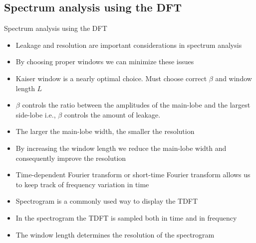 \documentclass[10pt, aspectratio=169]{beamer}
\begin{document}
\subsection{Spectrum analysis using the DFT}
\begin{frame}{Spectrum analysis using the DFT}
\begin{itemize}
	\item Leakage and resolution are important considerations in spectrum analysis
	\item By choosing proper windows we can minimize these issues
	\item Kaiser window is a nearly optimal choice. Must choose correct $\beta$ and window length $L$
	\item $\beta$ controls the ratio between the amplitudes of the main-lobe and the largest side-lobe i.e., $\beta$ controls the amount of leakage.
	\item The larger the main-lobe width, the smaller the resolution
	\item By increasing the window length we reduce the main-lobe width and consequently improve the resolution
	\item Time-dependent Fourier transform or short-time Fourier transform allows us to keep track of frequency variation in time
	\item Spectrogram is a commonly used way to display the TDFT
	\item In the spectrogram the TDFT is sampled both in time and in frequency
	\item The window length determines the resolution of the spectrogram
\end{itemize}
\end{frame}
\end{document}
